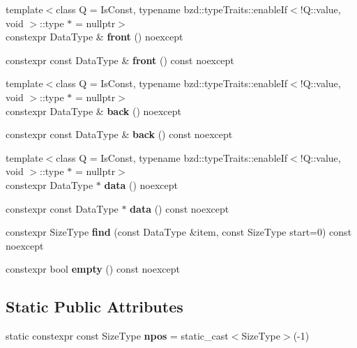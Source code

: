 \begin{DoxyCompactItemize}
{\footnotesize template$<$class Q  = Is\+Const, typename bzd\+::type\+Traits\+::enable\+If$<$!\+Q\+::value, void $>$\+::type $\ast$  = nullptr$>$ }\\constexpr Data\+Type \& {\bfseries front} () noexcept
\item 
\mbox{\label{classbzd_1_1Span_a388f1b3918cd2885330566aa50f3d087}} 
constexpr const Data\+Type \& {\bfseries front} () const noexcept
\item 
\mbox{\label{classbzd_1_1Span_ac89dff5757cbdeef6c6c900025775806}} 
{\footnotesize template$<$class Q  = Is\+Const, typename bzd\+::type\+Traits\+::enable\+If$<$!\+Q\+::value, void $>$\+::type $\ast$  = nullptr$>$ }\\constexpr Data\+Type \& {\bfseries back} () noexcept
\item 
\mbox{\label{classbzd_1_1Span_abb8cd092fe87f6f5d3c0208687687be3}} 
constexpr const Data\+Type \& {\bfseries back} () const noexcept
\item 
\mbox{\label{classbzd_1_1Span_ab053a80dcbce3fada31ef7928a543ace}} 
{\footnotesize template$<$class Q  = Is\+Const, typename bzd\+::type\+Traits\+::enable\+If$<$!\+Q\+::value, void $>$\+::type $\ast$  = nullptr$>$ }\\constexpr Data\+Type $\ast$ {\bfseries data} () noexcept
\item 
\mbox{\label{classbzd_1_1Span_ad6fd0cbc46dd05bf28c0bdfc92bfd504}} 
constexpr const Data\+Type $\ast$ {\bfseries data} () const noexcept
\item 
\mbox{\label{classbzd_1_1Span_aa024c6dcd31b0d85278d34101e15d828}} 
constexpr Size\+Type {\bfseries find} (const Data\+Type \&item, const Size\+Type start=0) const noexcept
\item 
\mbox{\label{classbzd_1_1Span_a1a73e8fc0549ac98ca7727860fa94cb5}} 
constexpr bool {\bfseries empty} () const noexcept
\end{DoxyCompactItemize}
\subsection*{Static Public Attributes}
\begin{DoxyCompactItemize}
\item 
\mbox{\label{classbzd_1_1Span_a8b2929e3d864dfb438a5c0e4179c5589}} 
static constexpr const Size\+Type {\bfseries npos} = static\+\_\+cast$<$Size\+Type$>$(-\/1)
\end{DoxyCompactItemize}
